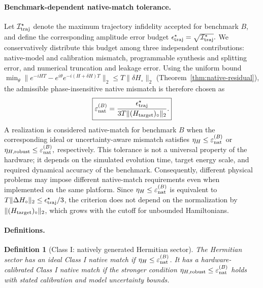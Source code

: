 \documentclass[pra,twocolumn,superscriptaddress,nofootinbib,floatfix]{revtex4-2}
\newtheorem{definition}{Definition}
\theoremstyle{remark}
\newcommand{\revcolor}{\color{blue}}
\DeclareRobustCommand{\rev}[1]{{\revcolor #1}}
\begin{document}
\paragraph{Benchmark-dependent native-match tolerance.}
Let \( \mathcal I_{\rm traj}^{\star} \) denote the maximum trajectory infidelity accepted for benchmark \(B\), and define the corresponding amplitude error budget \(\epsilon_{\rm traj}^{\star}=\sqrt{\mathcal I_{\rm traj}^{\star}}.\) We conservatively distribute this budget among three independent contributions: native-model and calibration mismatch, programmable synthesis and splitting error, and numerical truncation and leakage error. \rev{Using the uniform bound \(\min_\theta\|e^{-iH T}-e^{i\theta}e^{-i(H+\delta H)T}\|_2\le T\|\delta H_\circ\|_2\) (Theorem~\ref{thm:native-residual}), the admissible phase-insensitive native mismatch is therefore chosen as}
\begin{align}
\boxed{
\varepsilon_{\rm nat}^{(B)}=\frac{\epsilon_{\rm traj}^{\star}}{3T\|(H_{\rm target})_\circ\|_2}.
}
\label{eq:calibration-tolerance}
\end{align}
A realization is considered native-match for benchmark \(B\) when the corresponding ideal or uncertainty-aware mismatch satisfies \(\eta_H\leq \varepsilon_{\rm nat}^{(B)}\) or \(\eta_{H,\rm robust}\leq \varepsilon_{\rm nat}^{(B)},\) respectively. This tolerance is not a universal property of the hardware; it depends on the simulated evolution time, target energy scale, and required dynamical accuracy of the benchmark. Consequently, different physical problems may impose different native-match requirements even when implemented on the same platform. \rev{Since \(\eta_H\le\varepsilon_{\rm nat}^{(B)}\) is equivalent to \(T\|\Delta H_\circ\|_2\le\epsilon_{\rm traj}^\star/3\), the criterion does not depend on the normalization by \(\|(H_{\rm target})_\circ\|_2\), which grows with the cutoff for unbounded Hamiltonians.}

\paragraph{\rev{Definitions.}}
\begin{definition}[Class I: natively generated Hermitian sector]
\label{def:class-I}
The Hermitian sector has an \emph{ideal Class I native match} if \(\eta_H\leq\varepsilon_{\rm nat}^{(B)}\). \rev{It has a \emph{hardware-calibrated Class I native match} if the stronger condition \(\eta_{H,{\rm robust}}\leq\varepsilon_{\rm nat}^{(B)}\) holds with stated calibration and model uncertainty bounds.}
\end{definition}
\end{document}

